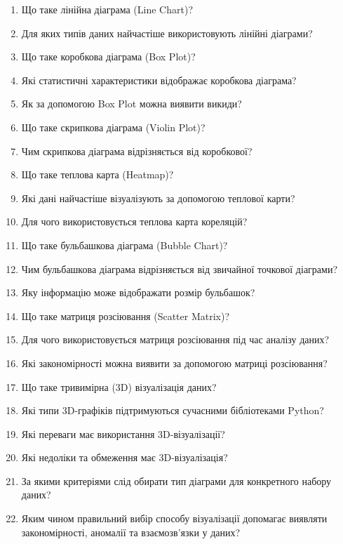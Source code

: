 \begin{enumerate}
\item Що таке лінійна діаграма (Line Chart)?
\item Для яких типів даних найчастіше використовують лінійні діаграми?
\item Що таке коробкова діаграма (Box Plot)?
\item Які статистичні характеристики відображає коробкова діаграма?
\item Як за допомогою Box Plot можна виявити викиди?
\item Що таке скрипкова діаграма (Violin Plot)?
\item Чим скрипкова діаграма відрізняється від коробкової?
\item Що таке теплова карта (Heatmap)?
\item Які дані найчастіше візуалізують за допомогою теплової карти?
\item Для чого використовується теплова карта кореляцій?
\item Що таке бульбашкова діаграма (Bubble Chart)?
\item Чим бульбашкова діаграма відрізняється від звичайної точкової діаграми?
\item Яку інформацію може відображати розмір бульбашок?
\item Що таке матриця розсіювання (Scatter Matrix)?
\item Для чого використовується матриця розсіювання під час аналізу даних?
\item Які закономірності можна виявити за допомогою матриці розсіювання?
\item Що таке тривимірна (3D) візуалізація даних?
\item Які типи 3D-графіків підтримуються сучасними бібліотеками Python?
\item Які переваги має використання 3D-візуалізації?
\item Які недоліки та обмеження має 3D-візуалізація?
\item За якими критеріями слід обирати тип діаграми для конкретного набору даних?
\item Яким чином правильний вибір способу візуалізації допомагає виявляти закономірності, аномалії та взаємозв'язки у даних?
\end{enumerate}